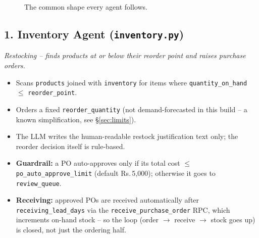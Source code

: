 \documentclass[11pt,a4paper]{article}
\newcommand{\Rs}{Rs.\,}
\newcommand{\agenthead}[2]{%
  \subsection*{\textcolor{accent}{#1}}%
  \textit{#2}\par\vspace{2pt}
}
\begin{document}
\begin{figure}[h]
\centering
{}
\caption{The common shape every agent follows.}
\end{figure}

\agenthead{1. Inventory Agent (\texttt{inventory.py})}{Restocking -- finds products at or below
their reorder point and raises purchase orders.}
\begin{itemize}[itemsep=1pt]
\item Scans \texttt{products} joined with \texttt{inventory} for items where
\texttt{quantity\_on\_hand} $\le$ \texttt{reorder\_point}.
\item Orders a fixed \texttt{reorder\_quantity} (not demand-forecasted in this build -- a
known simplification, see \S\ref{sec:limits}).
\item The LLM writes the human-readable restock justification text only; the reorder decision
itself is rule-based.
\item \textbf{Guardrail:} a PO auto-approves only if its total cost $\le$
\texttt{po\_auto\_approve\_limit} (default \Rs{}5{,}000); otherwise it goes to
\texttt{review\_queue}.
\item \textbf{Receiving:} approved POs are received automatically after
\texttt{receiving\_lead\_days} via the \texttt{receive\_purchase\_order} RPC, which increments
on-hand stock -- so the loop (order $\to$ receive $\to$ stock goes up) is closed, not just the
ordering half.
\end{itemize}
\end{document}
